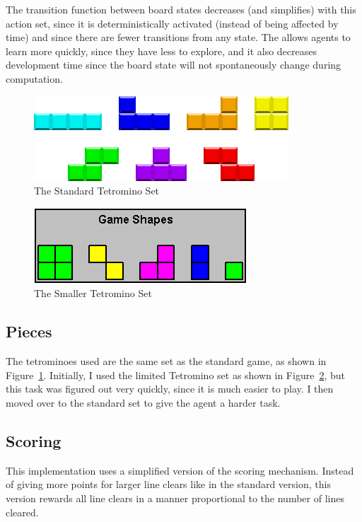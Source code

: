 \documentclass{article}
\begin{document}
The transition function between board states decreases (and simplifies) with this action set, since it is deterministically activated (instead of being affected by time) and since there are fewer transitions from any state. The allows agents to learn more quickly, since they have less to explore, and it also decreases development time since the board state will not spontaneously change during computation.

\begin{figure}[ht!]
  \centering
    \includegraphics[scale=0.5]{standardtets.png}
  \caption{The Standard Tetromino Set \cite{standardtets}}
  \label{fig:standardtets}
\end{figure}

\begin{figure}[ht!]
  \centering
    \includegraphics[scale=0.5]{smalltets.png}
  \caption{The Smaller Tetromino Set \cite{smalltets}}
  \label{fig:smalltets}
\end{figure}

\subsection{Pieces}
The tetrominoes used are the same set as the standard game, as shown in Figure~\ref{fig:standardtets}. Initially, I used the limited Tetromino set as shown in Figure~\ref{fig:smalltets}, but this task was figured out very quickly, since it is much easier to play. I then moved over to the standard set to give the agent a harder task. 

\subsection{Scoring}
This implementation uses a simplified version of the scoring mechanism. Instead of giving more points for larger line clears like in the standard version, this version rewards all line clears in a manner proportional to the number of lines cleared.
\end{document}
